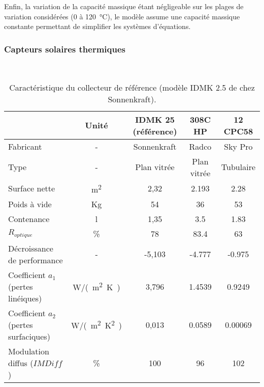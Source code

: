 Enfin, la variation de la capacité massique étant négligeable sur les plages de variation
considérées (0 à \SI{120}{\celsius}), le modèle assume une capacité massique constante
permettant de simplifier les systèmes d’équations.

\subsubsection{Capteurs solaires thermiques} %
\label{ssub:capteurs_solaires_thermiques}
~

\begin{table}
\centering
\begin{tabular}{l | c | ccc}
    \toprule
                                             & Unité                 & IDMK 25 (référence) & 308C HP & 12 CPC58    \\
    \midrule
    Fabricant                                & -                     & Sonnenkraft    & Radco          & Sky Pro   \\
    Type                                     & -                     & Plan vitrée    & Plan vitrée    & Tubulaire \\
    Surface nette                            & \si{m^{2}}            & 2,32           & 2.193          & 2.28      \\
    Poids à vide                             & \si{Kg}               & 54             & 36             & 53        \\
    Contenance                               & \si{l}                & 1,35           & 3.5            & 1.83      \\
    $R_{optique}$                            & \si{\%}               & 78             & 83.4           & 63        \\
    Décroissance de performance              & -                     & -5,103         & -4.777         & -0.975    \\
    Coefficient $a_{1}$ (pertes linéiques)   & \si{W/(m^{2}.K)}      & 3,796          & 1.4539         & 0.9249    \\
    Coefficient $a_{2}$ (pertes surfaciques) & \si{W/(m^{2}.K^{2})}  & 0,013          & 0.0589         & 0.00069   \\
    Modulation diffus ($IMDiff$)             & \si{\%}               & 100            & 96             & 102       \\
    \bottomrule
\end{tabular}
\caption{Caractéristique du collecteur de référence (modèle IDMK 2.5 de chez Sonnenkraft).
         \label{tab:capteurs_specs}}
\end{table}


